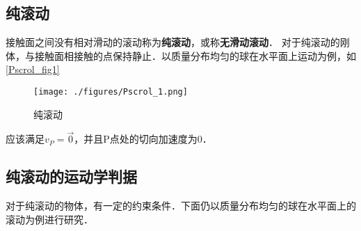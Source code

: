 \begin{issues}
\issueDraft
\issueTODO
\end{issues}

\subsection{纯滚动}
接触面之间没有相对滑动的滚动称为\textbf{纯滚动}，或称\textbf{无滑动滚动}．
对于纯滚动的刚体，与接触面相接触的点保持静止．以质量分布均匀的球在水平面上运动为例，如\autoref{Pscrol_fig1}
\begin{figure}[ht]
\centering
\texttt{[image: ./figures/Pscrol\_1.png]}
\caption{纯滚动} \label{Pscrol_fig1}
\end{figure}
应该满足$v_P=\vec 0$，并且P点处的切向加速度为0．

\subsection{纯滚动的运动学判据}
对于纯滚动的物体，有一定的约束条件．下面仍以质量分布均匀的球在水平面上的滚动为例进行研究．